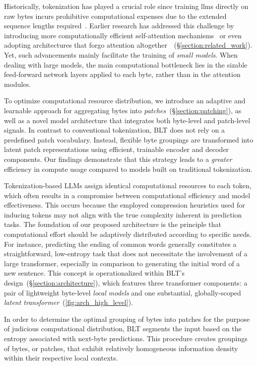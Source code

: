Historically, tokenization has played a crucial role since training llms directly on raw bytes incurs prohibitive computational expenses due to the extended sequence lengths required~\citep{xue2022byt5}. Earlier research has addressed this challenge by introducing more computationally efficient self-attention mechanisms~\citep{el2020characterbert, clark2022canine} or even adopting architectures that forgo attention altogether~\citep{wang2024mambabyte}~(\S\ref{section:related_work}). Yet, such advancements mainly facilitate the training of \textit{small models}. When dealing with large models, the main computational bottleneck lies in the sizable feed-forward network layers applied to each byte, rather than in the attention modules.

To optimize computational resource distribution, we introduce an adaptive and learnable approach for aggregating bytes into \textit{patches}~(\S\ref{section:patching}), as well as a novel model architecture that integrates both byte-level and patch-level signals. In contrast to conventional tokenization, {\textsc BLT} does not rely on a predefined patch vocabulary. Instead, flexible byte groupings are transformed into latent patch representations using efficient, trainable encoder and decoder components. Our findings demonstrate that this strategy leads to a \textit{greater} efficiency in compute usage compared to models built on traditional tokenization.

Tokenization-based LLMs assign identical computational resources to each token, which often results in a compromise between computational efficiency and model effectiveness. This occurs because the employed compression heuristics used for inducing tokens may not align with the true complexity inherent in prediction tasks. The foundation of our proposed architecture is the principle that computational effort should be adaptively distributed according to specific needs. For instance, predicting the ending of common words generally constitutes a straightforward, low-entropy task that does not necessitate the involvement of a large transformer, especially in comparison to generating the initial word of a new sentence. This concept is operationalized within {\textsc BLT}'s design~(\S\ref{section:architecture}), which features three transformer components: a pair of lightweight byte-level \textit{local models} and one substantial, globally-scoped \textit{latent transformer}~(\autoref{fig:arch_high_level}). 

In order to determine the optimal grouping of bytes into patches for the purpose of judicious computational distribution, {\textsc BLT} segments the input based on the entropy associated with next-byte predictions. This procedure creates groupings of bytes, or patches, that exhibit relatively homogeneous information density within their respective local contexts.

